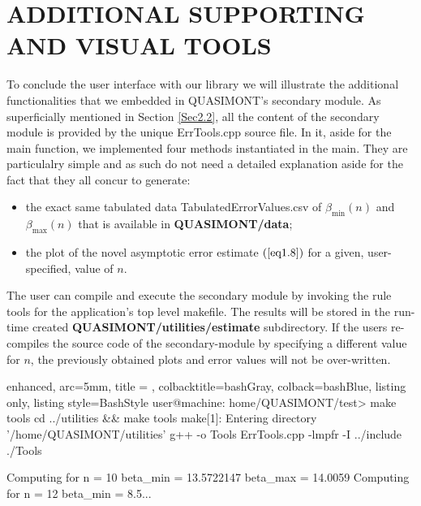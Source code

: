 \documentclass[a4paper, twosided]{book}
\begin{document}
\section[Additional supporting and visual tools]{\changefont ADDITIONAL SUPPORTING AND VISUAL TOOLS}\label{Sec3.4}

To conclude the user interface with our library we will illustrate the additional functionalities that we embedded in QUASIMONT's secondary module. As superficially mentioned in Section \ref{Sec2.2}, all the content of the secondary module is provided by the unique \colorbox{poliGrayBlue}{ErrTools.cpp} source file. In it, aside for the \colorbox{poliGrayBlue}{main} function, we implemented four methods instantiated in the \colorbox{poliGrayBlue}{main}. They are particulalry simple and as such do not need a detailed explanation aside for the fact that they all concur to generate:
\begin{itemize}
    \item the exact same tabulated data \colorbox{poliGrayBlue}{TabulatedErrorValues.csv} of $\beta_{\text{min}}(n)$ and $\beta_{\text{max}}(n)$ that is available in \colorbox{poliGrayBlue}{\textbf{QUASIMONT/data}};
    \item the plot of the novel asymptotic error estimate $(\ref{eq1.8})$ for a given, user-specified, value of $n$.
\end{itemize}

The user can compile and execute the secondary module by invoking the rule \colorbox{poliGrayBlue}{tools} for the application's top level \colorbox{poliGrayBlue}{makefile}. The results will be stored in the run-time created \colorbox{poliGrayBlue}{\textbf{QUASIMONT/utilities/estimate}} subdirectory. If the users re-compiles the source code of the secondary-module by specifying a different value for $n$, the previously obtained plots and error values will not be over-written.

\vspace{0.25cm}
\begin{tcblisting}{enhanced,
                   arc=5mm,
                   title = \color{black}{\large \ttfamily Compilation and execution of QUASIMONT's secondary module},
                   colbacktitle=bashGray,
                   colback=bashBlue,
                   listing only,
                   listing style=BashStyle}
user@machine: home/QUASIMONT/test> make tools
cd ../utilities && make tools
make[1]: Entering directory '/home/QUASIMONT/utilities'
g++ -o Tools ErrTools.cpp -lmpfr -I ../include
./Tools

Computing for n = 10
    beta_min = 13.5722147
    beta_max = 14.0059
Computing for n = 12
    beta_min = 8.5...
\end{tcblisting}
\end{document}
